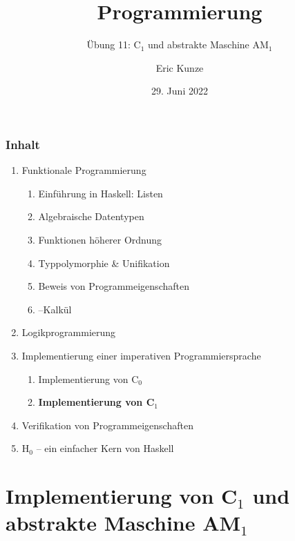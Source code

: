 \documentclass{beamer}
\begin{document}
	
	\title{Programmierung}
	\subtitle{Übung 11: C${}_\text{1}$ und abstrakte Maschine AM${}_\text{1}$}
	\author{Eric Kunze}
	\date{29. Juni 2022}
	
	\maketitle
	


\begin{frame}[fragile] \frametitle{Inhalt}
	\begin{enumerate}
		\item Funktionale Programmierung
		\begin{enumerate}
			\item Einführung in Haskell: Listen
			\item Algebraische Datentypen
			\item Funktionen höherer Ordnung
			\item Typpolymorphie \& Unifikation
			\item Beweis von Programmeigenschaften
			\item \textlambda--Kalkül
		\end{enumerate}
		\item Logikprogrammierung
		\item Implementierung einer imperativen Programmiersprache
		\begin{enumerate}
			\item Implementierung von C${}_\text{0}$
			\item \textbf{Implementierung von C${}_\text{1}$}
		\end{enumerate}
		\item Verifikation von Programmeigenschaften
		\item H${}_\text{0}$ -- ein einfacher Kern von Haskell
	\end{enumerate}
\end{frame}



\section{Implementierung von C${}_\text{1}$ und abstrakte Maschine AM${}_\text{1}$}
\end{document}
